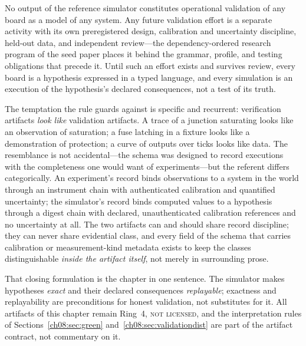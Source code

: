 \begin{ruleenv}\label{ch08:rule:sargent}
No output of the reference simulator constitutes operational validation of any board as a model of any system. Any future validation effort is a separate activity with its own preregistered design, calibration and uncertainty discipline, held-out data, and independent review---the dependency-ordered research program of the seed paper places it behind the grammar, profile, and testing obligations that precede it. Until such an effort exists and survives review, every board is a hypothesis expressed in a typed language, and every simulation is an execution of the hypothesis's declared consequences, not a test of its truth.
\end{ruleenv}

The temptation the rule guards against is specific and recurrent: verification artifacts \emph{look like} validation artifacts. A trace of a junction saturating looks like an observation of saturation; a fuse latching in a fixture looks like a demonstration of protection; a curve of outputs over ticks looks like data. The resemblance is not accidental---the schema was designed to record executions with the completeness one would want of experiments---but the referent differs categorically. An experiment's record binds observations to a system in the world through an instrument chain with authenticated calibration and quantified uncertainty; the simulator's record binds computed values to a hypothesis through a digest chain with declared, unauthenticated calibration references and no uncertainty at all. The two artifacts can and should share record discipline; they can never share evidential class, and every field of the schema that carries calibration or measurement-kind metadata exists to keep the classes distinguishable \emph{inside the artifact itself}, not merely in surrounding prose.

That closing formulation is the chapter in one sentence. The simulator makes hypotheses \emph{exact} and their declared consequences \emph{replayable}; exactness and replayability are preconditions for honest validation, not substitutes for it. All artifacts of this chapter remain Ring~4, \textsc{not licensed}, and the interpretation rules of Sections~\ref{ch08:sec:green} and~\ref{ch08:sec:validationdist} are part of the artifact contract, not commentary on it.
